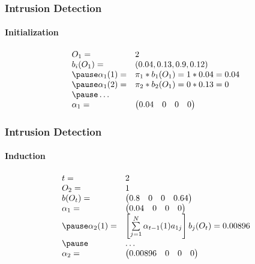 \documentclass{beamer}
\begin{document}
\begin{frame}
  \frametitle{Intrusion Detection}
  \framesubtitle{Initialization}
  $$
  \begin{array}{ll}
    O_1 =& 2 \\
    b_i(O_1) =& (0.04, 0.13, 0.9, 0.12)\\ \pause
    \alpha_1(1) =& \pi_1 * b_1(O_1) = 1 * 0.04 = 0.04 \\ \pause
    \alpha_1(2) =& \pi_2 * b_2(O_1) =0 * 0.13 = 0 \\ \pause
    \ldots \\
    \alpha_1 =& \begin{pmatrix} 0.04 & 0 & 0 & 0\end{pmatrix}
  \end{array}
  $$
\end{frame}
\begin{frame}
  \frametitle{Intrusion Detection}
  \framesubtitle{Induction}
  \pause
  $$
  \begin{array}{ll}
    t= & 2\\
    O_2 =& 1 \\
    b(O_t) =& \begin{pmatrix}0.8& 0& 0& 0.64\end{pmatrix}\\
    \alpha_1 =& \begin{pmatrix} 0.04 & 0 & 0 & 0\end{pmatrix}\\ \pause
    \alpha_2(1) =& \left[ \sum\limits_{j=1}^N\alpha_{t-1}(1)a_{1j}\right] b_j
                   (O_t) = 0.00896 \\ \pause
       & \ldots \\
    \alpha_2 =& \begin{pmatrix} 0.00896 & 0 & 0 & 0\end{pmatrix}\\
  
  \end{array}
  $$
\end{frame}
\end{document}
